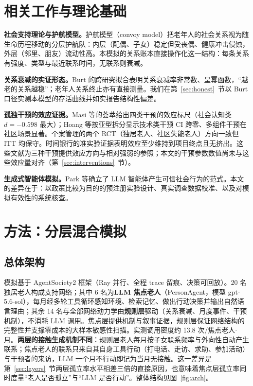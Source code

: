 \documentclass[10.5pt,twocolumn]{ctexart}
\begin{document}
\section{相关工作与理论基础}
\textbf{社会支持理论与护航模型。}护航模型（convoy model）\citep{kahn1980convoys}把老年人的社会关系视为随生命历程移动的分层护航队：内层（配偶、子女）稳定但受丧偶、健康冲击侵蚀，外层（邻里、朋友）流动性高。本模拟的关系账本直接操作化这一结构：每条关系有强度、类型与最近联系时间，无联系则衰减。

\textbf{关系衰减的实证形态。}Burt 的跨研究拟合表明关系衰减率非常数、呈幂函数，``越老的关系越稳''\citep{burt2000decay}；老年人关系终止亦有直接测量\citep{kleinikkink1999broken}。我们在第~\ref{sec:honest}~节以 Burt 口径实测本模型的存活曲线并如实报告结构性偏差。

\textbf{孤独干预的效应证据。}Masi 等的荟萃给出四类干预的效应标尺（社会认知类 $d=-0.598$ 最大）\citep{masi2011meta}；Hoang 等按亚型拆分显示技术类干预 CI 跨零、多组件干预在社区场景显著\citep{hoang2022interventions}。个案管理的两个 RCT（独居老人\citep{ristolainen2020effects}、社区失能老人\citep{taube2018case}）方向一致但 ITT 均保守。时间银行的准实验证据表明效应至少维持到项目终点且无挤出\citep{lu2024timebank}。这些文献为三种干预提供效应方向与相对强弱的参照；本文的干预参数数值尚未与这些效应量对齐（第~\ref{sec:interventions}~节）。

\textbf{生成式智能体模拟。}Park 等确立了 LLM 智能体产生可信社会行为的范式\citep{park2023generative}。本文的差异在于：以政策比较为目的的预注册实验设计、真实调查数据校准、以及对模拟有效性的系统核查。

\section{方法：分层混合模拟}
\subsection{总体架构}
模拟基于 AgentSociety2 框架（Ray 并行、全程 trace 留痕、决策可回放）。20 名独居老人构成支持网络；其中 6 名为\textbf{LLM 焦点老人}（PersonAgent，模型 gpt-5.6-sol），每月经多轮工具循环感知环境、检索记忆、做出行动决策并输出自然语言理由；其余 14 名与全部网络动力学由\textbf{规则层}驱动（关系衰减、月度事件、干预机制），不消耗 LLM 调用。焦点层提供机制与叙事证据，规则层保证网络结构的完整性并支撑零成本的大样本敏感性扫描。实测调用密度约 13.8 次/焦点老人$\cdot$月。\textbf{两层的接触生成机制不同}：规则层老人每月按子女联系频率与外向性自动产生联系；焦点老人的联系只来自其自身工具行动（打电话、走访、求助、参加活动）与干预者的来访，LLM 一个月不行动即记为当月无接触。这一差异是第~\ref{sec:layers}~节两层孤立率水平相差三倍的直接原因，也意味着焦点层孤立率同时度量``老人是否孤立''与``LLM 是否行动''。整体结构见图~\ref{fig:arch}。
\end{document}
